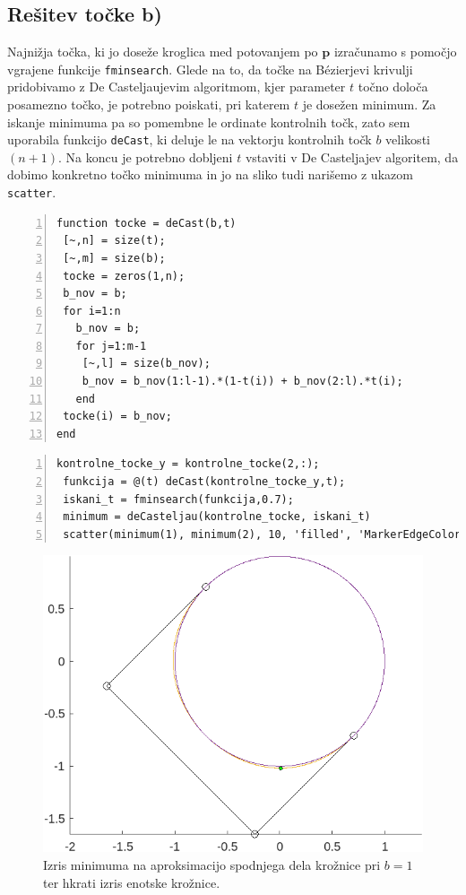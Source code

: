 \documentclass[a4paper,12pt]{article}
\begin{document}
	\subsection{Rešitev točke b)}
	Najnižja točka, ki jo doseže kroglica med potovanjem po $\boldsymbol{p}$ izračunamo s pomočjo vgrajene funkcije \lstinline[style=Matlab-editor]!fminsearch!. Glede na to, da točke na 
	B\'ezierjevi krivulji pridobivamo z De Casteljaujevim algoritmom, kjer parameter $t$ točno določa posamezno točko, je potrebno poiskati, pri katerem $t$ je dosežen minimum. Za iskanje minimuma pa so
	pomembne le ordinate kontrolnih točk, zato sem uporabila funkcijo \lstinline[style=Matlab-editor]!deCast!, ki deluje le na vektorju kontrolnih točk $b$ velikosti $(n+1)$. Na koncu je potrebno dobljeni $t$ vstaviti v  
	De Casteljajev algoritem, da dobimo konkretno točko minimuma in jo na sliko tudi narišemo z ukazom \lstinline[style=Matlab-editor]!scatter!.

	\begin{lstlisting}[style=Matlab-editor,	numbers=left,]
function tocke = deCast(b,t)
 [~,n] = size(t);
 [~,m] = size(b);
 tocke = zeros(1,n);
 b_nov = b;
 for i=1:n
   b_nov = b;
   for j=1:m-1
    [~,l] = size(b_nov);
    b_nov = b_nov(1:l-1).*(1-t(i)) + b_nov(2:l).*t(i);
   end
 tocke(i) = b_nov;
end
\end{lstlisting}


	\begin{lstlisting}[style=Matlab-editor,	numbers=left,]
 kontrolne_tocke_y = kontrolne_tocke(2,:);
 funkcija = @(t) deCast(kontrolne_tocke_y,t);
 iskani_t = fminsearch(funkcija,0.7);
 minimum = deCasteljau(kontrolne_tocke, iskani_t)
 scatter(minimum(1), minimum(2), 10, 'filled', 'MarkerEdgeColor', 'k', 'MarkerFaceColor', 'g')
	\end{lstlisting}

	\clearpage

	\begin{figure}[h!]
		\centering
		\includegraphics[scale=0.7]{slika3.png}
		\caption{Izris minimuma na aproksimacijo spodnjega dela krožnice pri $b = 1$ ter hkrati izris enotske krožnice.}
	\end{figure}
	
\end{document}
